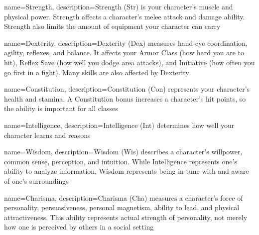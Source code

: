  {
}

{
name=Strength,
description={Strength (Str) is your character's muscle and physical power. Strength affects a character's melee attack and damage ability. Strength also limits the amount of equipment your character can carry}
}

{
name=Dexterity,
description={Dexterity (Dex) measures hand-eye coordination, agility, reflexes, and balance. It affects your Armor Class (how hard you are to hit), Reflex Save (how well you dodge area attacks), and Initiative (how often you go first in a fight). Many skills are also affected by Dexterity}
}

{
name=Constitution,
description={Constitution (Con) represents your character's health and stamina. A Constitution bonus increases a character's hit points, so the ability is important for all classes}
}

{
name=Intelligence,
description={Intelligence (Int) determines how well your character learns and reasons}
}

{
name=Wisdom,
description={Wisdom (Wis) describes a character's willpower, common sense, perception, and intuition. While Intelligence represents one's ability to analyze information, Wisdom represents being in tune with and aware of one's surroundings}
}

{
name=Charisma,
description={Charisma (Cha) measures a character's force of personality, persuasiveness, personal magnetism, ability to lead, and physical attractiveness. This ability represents actual strength of personality, not merely how one is perceived by others in a social setting}
}